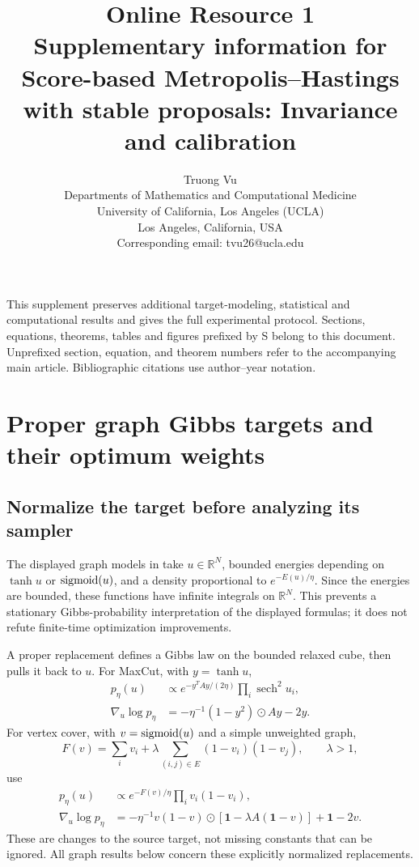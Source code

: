\documentclass[11pt]{article}
\title{Online Resource 1\\Supplementary information for\\Score-based Metropolis--Hastings with stable proposals: Invariance and calibration}
\author{Truong Vu\\Departments of Mathematics and Computational Medicine\\
University of California, Los Angeles (UCLA)\\Los Angeles, California, USA\\
Corresponding email: tvu26@ucla.edu}
\date{}
\theoremstyle{definition}\newtheorem{definition}[theorem]{Definition}
\theoremstyle{remark}\newtheorem{remark}[theorem]{Remark}
\numberwithin{equation}{section}
\newcommand{\R}{\mathbb R}\newcommand{\E}{\mathbb E}\newcommand{\Prob}{\mathbb P}
\newcommand{\sech}{\operatorname{sech}}\newcommand{\Var}{\operatorname{Var}}
\newcommand{\1}{\mathbf 1}
\begin{document}
\maketitle

\noindent This supplement preserves additional target-modeling, statistical and computational results and gives the full experimental protocol. Sections, equations, theorems, tables and figures prefixed by S belong to this document. Unprefixed section, equation, and theorem numbers refer to the accompanying main article. Bibliographic citations use author--year notation.

\section{Proper graph Gibbs targets and their optimum weights}\label{sec:graphs}
\subsection{Normalize the target before analyzing its sampler}\label{sec:decoder}
The displayed graph models in \citet{fractional} take $u\in\R^N$, bounded energies depending on $\tanh u$ or $\operatorname{sigmoid}(u)$, and a density proportional to $e^{-E(u)/\eta}$. Since the energies are bounded, these functions have infinite integrals on $\R^N$. This prevents a stationary Gibbs-probability interpretation of the displayed formulas; it does not refute finite-time optimization improvements.

A proper replacement defines a Gibbs law on the bounded relaxed cube, then pulls it back to $u$. For MaxCut, with $y=\tanh u$,
\begin{align}
p_\eta(u)&\propto e^{-y^TAy/(2\eta)}\prod_i\sech^2u_i,\label{eq:cutproper}\\
\nabla_u\log p_\eta&=-\eta^{-1}(1-y^2)\odot Ay-2y.
\end{align}
For vertex cover, with $v=\operatorname{sigmoid}(u)$ and a simple unweighted graph,
\begin{equation}
F(v)=\sum_iv_i+\lambda\sum_{(i,j)\in E}(1-v_i)(1-v_j),\qquad \lambda>1,\label{eq:VCenergy}
\end{equation}
use
\begin{align}
p_\eta(u)&\propto e^{-F(v)/\eta}\prod_iv_i(1-v_i),\label{eq:VCproper}\\
\nabla_u\log p_\eta&=-\eta^{-1}v(1-v)\odot[\1-\lambda A(\1-v)]+\1-2v.\label{eq:VCproperscore}
\end{align}
These are changes to the source target, not missing constants that can be ignored. All graph results below concern these explicitly normalized replacements.
\end{document}
